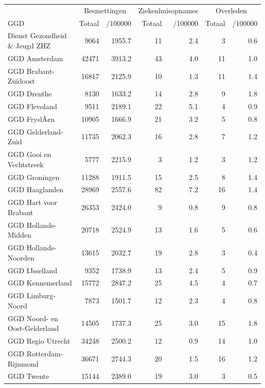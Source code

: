 \documentclass[
  english,
  man,floatsintext]{apa6}
\begin{document}
\begin{table}
\centering\begingroup\fontsize{10}{12}\selectfont

\begin{threeparttable}
\begin{tabular}{lrrrrrr}
\toprule
\multicolumn{1}{c}{ } & \multicolumn{2}{c}{Besmettingen} & \multicolumn{2}{c}{Ziekenhuisopnames} & \multicolumn{2}{c}{Overleden} \\
\cmidrule(l{3pt}r{3pt}){2-3} \cmidrule(l{3pt}r{3pt}){4-5} \cmidrule(l{3pt}r{3pt}){6-7}
GGD & Totaal & /100000 & Totaal & /100000 & Totaal & /100000\\
\midrule
Dienst Gezondheid \& Jeugd ZHZ & 9064 & 1955.7 & 11 & 2.4 & 3 & 0.6\\
GGD Amsterdam & 42471 & 3913.2 & 43 & 4.0 & 11 & 1.0\\
GGD Brabant-Zuidoost & 16817 & 2125.9 & 10 & 1.3 & 11 & 1.4\\
GGD Drenthe & 8130 & 1633.2 & 14 & 2.8 & 9 & 1.8\\
GGD Flevoland & 9511 & 2189.1 & 22 & 5.1 & 4 & 0.9\\
GGD FryslÃ¢n & 10905 & 1666.9 & 21 & 3.2 & 5 & 0.8\\
GGD Gelderland-Zuid & 11735 & 2062.3 & 16 & 2.8 & 7 & 1.2\\
GGD Gooi en Vechtstreek & 5777 & 2215.9 & 3 & 1.2 & 3 & 1.2\\
GGD Groningen & 11288 & 1911.5 & 15 & 2.5 & 8 & 1.4\\
GGD Haaglanden & 28969 & 2557.6 & 82 & 7.2 & 16 & 1.4\\
GGD Hart voor Brabant & 26353 & 2424.0 & 9 & 0.8 & 9 & 0.8\\
GGD Hollands-Midden & 20718 & 2524.9 & 13 & 1.6 & 5 & 0.6\\
GGD Hollands-Noorden & 13615 & 2032.7 & 19 & 2.8 & 3 & 0.4\\
GGD IJsselland & 9352 & 1738.9 & 13 & 2.4 & 5 & 0.9\\
GGD Kennemerland & 15772 & 2847.2 & 25 & 4.5 & 4 & 0.7\\
GGD Limburg-Noord & 7873 & 1501.7 & 12 & 2.3 & 4 & 0.8\\
GGD Noord- en Oost-Gelderland & 14505 & 1737.3 & 25 & 3.0 & 15 & 1.8\\
GGD Regio Utrecht & 34248 & 2500.2 & 12 & 0.9 & 14 & 1.0\\
GGD Rotterdam-Rijnmond & 36671 & 2744.3 & 20 & 1.5 & 16 & 1.2\\
GGD Twente & 15144 & 2389.0 & 19 & 3.0 & 3 & 0.5\\

\end{tabular}
\end{threeparttable}
\end{table}
\end{document}
